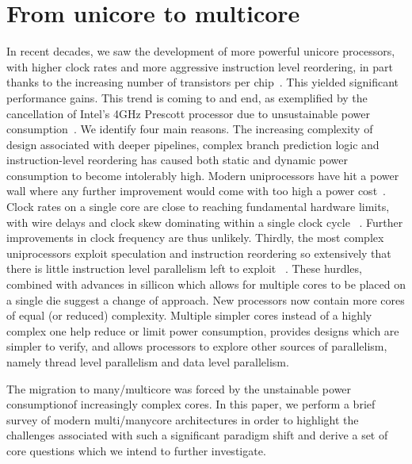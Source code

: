 \section{From unicore to multicore}

In recent decades, we saw the development of more powerful
unicore processors, with higher clock rates and more
aggressive instruction level reordering, in part
thanks to the increasing number of transistors per chip~\cite{SR97}.
This yielded significant performance gains. This trend is coming to and end,
as exemplified by the cancellation of Intel's
4GHz Prescott processor due to unsustainable
power consumption~\cite{Pentium}. We identify
four main reasons. The increasing complexity
of design associated with deeper pipelines,
complex branch prediction logic and instruction-level
reordering has caused both static and dynamic power consumption
to become intolerably high. Modern uniprocessors have hit
a power wall where any further improvement would come
with too high a power cost~\cite{EH11}. Clock rates on
a single core are close to reaching fundamental hardware limits,
with wire delays and clock skew dominating within a single clock cycle ~\cite{EH11}.
Further improvements in clock frequency are thus unlikely. Thirdly, the most
complex uniprocessors exploit speculation and instruction reordering so
extensively that there is little instruction level parallelism left to
exploit ~\cite{EH11}. These hurdles, combined with advances in sillicon which allows
for multiple cores to be placed on a single die suggest a change of approach.
 New processors now contain more cores of equal (or reduced) complexity.
Multiple simpler cores instead of a highly complex one help reduce or limit power consumption,
provides designs which are simpler to verify, and allows processors
to explore other sources of parallelism, namely thread level parallelism
and data level parallelism.

The migration to many/multicore was forced by the unstainable power consumptionof increasingly complex cores. In this paper, we perform a brief
survey of modern multi/manycore architectures in order to highlight
the challenges associated with such a significant paradigm shift and derive
a set of core questions which we intend to further investigate.

